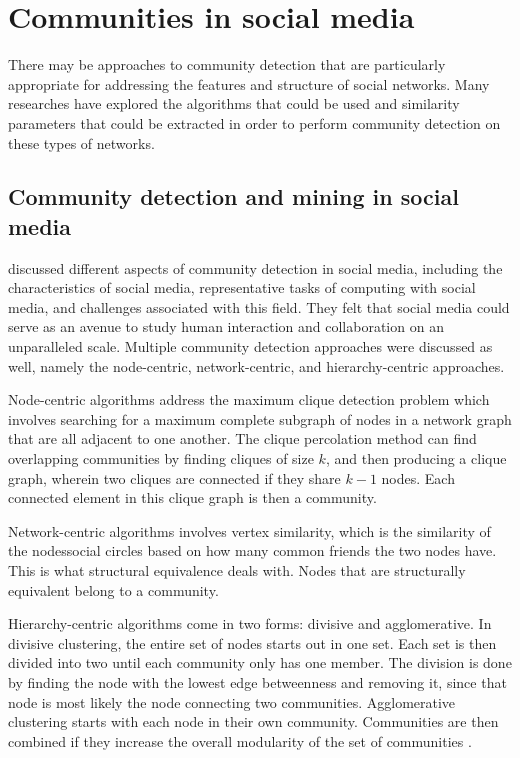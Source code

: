\section{Communities in social media}


There may be approaches to community detection that are particularly appropriate for addressing the features and structure of social networks. Many researches have explored the algorithms that could be used and similarity parameters that could be extracted in order to perform community detection on these types of networks.


\subsection{Community detection and mining in social media}


 discussed different aspects of community detection in social media, including the characteristics of social media, representative tasks of computing with social media, and challenges associated with this field. They felt that social media could serve as an avenue to study human interaction and collaboration on an unparalleled scale. Multiple community detection approaches were discussed as well, namely the node-centric, network-centric, and hierarchy-centric approaches.


Node-centric algorithms address the maximum clique detection problem which involves searching for a maximum complete subgraph of nodes in a network graph that are all adjacent to one another. The clique percolation method can find overlapping communities by finding cliques of size $k$, and then producing a clique graph, wherein two cliques are connected if they share $k-1$ nodes. Each connected element in this clique graph is then a community.


Network-centric algorithms involves vertex similarity, which is the similarity of the nodes\vtick  social circles based on how many common friends the two nodes have. This is what structural equivalence deals with. Nodes that are structurally equivalent belong to a community. 


Hierarchy-centric algorithms come in two forms: divisive and agglomerative. In divisive clustering, the entire set of nodes starts out in one set. Each set is then divided into two until each community only has one member. The division is done by finding the node with the lowest edge betweenness and removing it, since that node is most likely the node connecting two communities. Agglomerative clustering starts with each node in their own community. Communities are then combined if they increase the overall modularity of the set of communities \cite{Tang:2010}.


